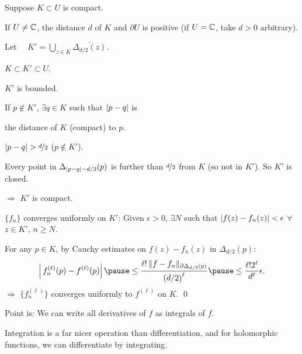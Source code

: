 \documentclass[10pt,aspectratio=169]{beamer}
\begin{document}
\begin{frame}
Suppose $K \subset U$ is compact.

\medskip
\pause

If $U \not= {\mathbb{C}}$, the distance $d$ of
$K$ and $\partial U$ is positive
(if $U={\mathbb{C}}$, take $d > 0$ arbitrary).

\medskip
\pause

Let
$\displaystyle
\quad
K' = \bigcup_{z \in K} \overline{\Delta_{d/2}(z)} .
$

\medskip
\pause

$K \subset K' \subset U$.

\vspace*{-0.5in}
\hspace*{2.5in}%
\pause

\vspace*{-0.6in}

$K'$ is bounded.

\pause

If $p \notin K'$, $\exists q \in K$ such that
$\lvert {p-q} \rvert$ is

the distance of $K$ (compact) to $p$.

\pause
$\lvert {p-q} \rvert > \nicefrac{d}{2}$  \quad ($p\not\in K'$).

\pause
Every point in $\Delta_{\lvert {p-q} \rvert-d/2}(p)$
is further than $\nicefrac{d}{2}$ from $K$ (so not in $K'$).  So $K'$ is closed.

\pause

$\Rightarrow$ $K'$ is compact.

\medskip
\pause

$\{ f_n \}$ converges uniformly on $K'$:
\pause
Given $\epsilon > 0$, $\exists N$ such that
$\lvert {f(z)-f_n(z)} \rvert < \epsilon$ $\forall$ $z \in K'$, $n \geq N$.

\medskip
\pause
For any $p \in K$, by Cauchy estimates
on $f(z)-f_n(z)$
in $\Delta_{d/2}(p)$:
\pause
\begin{equation*}
\abs{
\,
f_n^{(\ell)}(p)
-
f^{(\ell)}(p)
}
\pause
\leq
\frac{\ell! \, \snorm{f-f_n}_{\partial \Delta_{d/2}(p)}}{{(d/2)}^{\ell}}
\pause
\leq
\frac{\ell!2^\ell}{d^\ell}\epsilon .
\end{equation*}
\pause
$\Rightarrow$ $\bigl\{ f_n^{(\ell)} \bigr\}$ converges uniformly to $f^{(\ell)}$ on $K$.
\qed
\end{frame}

\begin{frame}

Point is: We can write all derivatives of $f$ as integrals of $f$.

\medskip
\pause

Integration is a far nicer operation than differentiation, and for
holomorphic functions, we can differentiate by integrating.
\end{frame}
\end{document}
